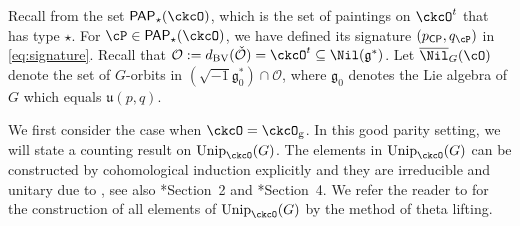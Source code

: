\documentclass[12pt,a4paper]{amsart}
\newcommand{\trivial}[2][]{\if\relax\detokenize{#1}\relax
  {%
      \color{orange} \vspace{0em} $[$  #2 $]$
      \color{black}
  }
  \else
\ifx#1h
\ifcsname showtrivial\endcsname
{%
    \color{orange} \vspace{0em}  $[$ #2 $]$
    \color{black}
}
\fi
\else {\red Wrong argument!} \fi
\fi
}
\def\subset{\subseteq}
\def\Im{\operatorname{Im}}
\newcommand{\CO}{{\mathcal {O}}}
\newcommand{\CP}{{\mathcal {P}}}
\newcommand{\g}{\mathfrak g}
\renewcommand{\u}{\mathfrak u}
\numberwithin{equation}{section}
\theoremstyle{remark}
\def\Unip{\mathrm{Unip}}
\def\dBV{d_{\mathrm{BV}}}
\def\CP{\mathsf{CP}}
\def\Cint#1{\Coh_{[#1]}}
\def\PP{\mathsf{PAP}}
\def\Im{\mathrm{Im}}
\def\Coh{\mathrm{Coh}}
\begin{document}
Recall from  the set $\PP_{\star}(\ckcO)$, which is the set of paintings on $\ckcO^{t}$ that has type $\star$.
For $\cP \in \PP_{\star}(\ckcO)$, we have defined its signature $(p_\CP, q_\cP)$ in \eqref{eq:signature}. Recall that $\CO:=\dBV(\check \CO)=\ckcO^t\subset \Nil(\g^*)$.  Let $\overline \Nil_{G}(\cO)$ denote the set of $G$-orbits in $(\sqrt{-1}\g_0^*)\cap \CO$, where $\g_0$ denotes the Lie algebra of $G$ which equals $\u(p,q)$.

We first consider the case when  $\ckcO = \ckcO_{\mathrm g}$.
In this good parity setting, we will state a counting result on
$\Unip_{\ckcO}(G)$. The elements in $\Unip_{\ckcO}(G)$ can be constructed by
cohomological induction explicitly and they are irreducible and unitary due to
\cite{Mat96,Tr.U}, see also \cite{Tr.H}*{Section~2} and \cite{MR.U}*{Section~4}.
We refer the reader to \cite{BMSZ2} for the construction of all elements of $\Unip_{\ckcO}(G)$ by the method of theta lifting.
\end{document}
